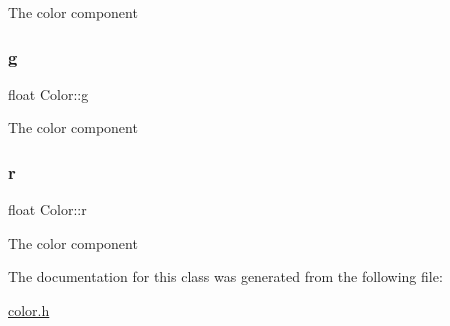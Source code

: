 The color component \mbox{\label{class_color_a5defbb21620e480e556181772d665f34}} 
\subsubsection{\texorpdfstring{g}{g}}
{\footnotesize\ttfamily float Color\+::g}

The color component \mbox{\label{class_color_a3958a556b47d2de3dd45c75aac833c20}} 
\subsubsection{\texorpdfstring{r}{r}}
{\footnotesize\ttfamily float Color\+::r}

The color component 

The documentation for this class was generated from the following file\+:\begin{DoxyCompactItemize}
\item 
\mbox{\hyperlink{color_8h}{color.\+h}}\end{DoxyCompactItemize}
